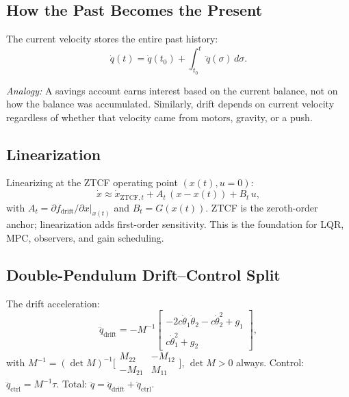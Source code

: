 \documentclass[11pt]{article}
\begin{document}
\subsection{How the Past Becomes the Present}

The current velocity stores the entire past history:
\begin{equation}\label{eq:state-accumulation}
\dot{q}(t) = \dot{q}(t_0) + \int_{t_0}^{t} \ddot{q}(\sigma)\,d\sigma.
\end{equation}

\textit{Analogy:} A savings account earns interest based on the current balance, not on how the balance was accumulated. Similarly, drift depends on current velocity regardless of whether that velocity came from motors, gravity, or a push.

\subsection{Linearization}\label{sec:linearization}

Linearizing at the ZTCF operating point $(x(t), u = 0)$:
\begin{equation}\label{eq:linearized}
\dot{x} \approx \dot{x}_{\mathrm{ZTCF},t} + A_t\,(x - x(t)) + B_t\,u,
\end{equation}
with $A_t = \partial f_{\mathrm{drift}}/\partial x|_{x(t)}$ and $B_t = G(x(t))$. ZTCF is the zeroth-order anchor; linearization adds first-order sensitivity. This is the foundation for LQR, MPC, observers, and gain scheduling.

\subsection{Double-Pendulum Drift--Control Split}

The drift acceleration:
\begin{equation}
\ddot{q}_{\mathrm{drift}} = -M^{-1}\begin{bmatrix}
-2c\dot\theta_1\dot\theta_2 - c\dot\theta_2^2 + g_1 \\
c\dot\theta_1^2 + g_2
\end{bmatrix},
\end{equation}
with $M^{-1} = (\det M)^{-1}\bigl[\begin{smallmatrix}M_{22}&-M_{12}\\-M_{21}&M_{11}\end{smallmatrix}\bigr]$, $\det M > 0$ always. Control: $\ddot{q}_{\mathrm{ctrl}} = M^{-1}\tau$. Total: $\ddot{q} = \ddot{q}_{\mathrm{drift}} + \ddot{q}_{\mathrm{ctrl}}$.
\end{document}
